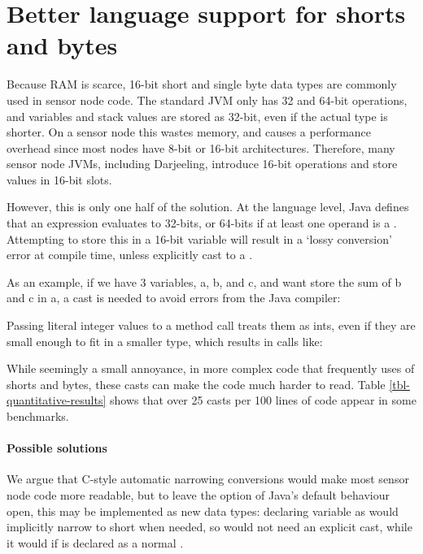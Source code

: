 \section{Better language support for shorts and bytes}
\label{sec-small-datatypes}
Because RAM is scarce, 16-bit short and single byte data types are commonly used in sensor node code. The standard JVM only has 32 and 64-bit operations, and variables and stack values are stored as 32-bit, even if the actual type is shorter. On a sensor node this wastes memory, and causes a performance overhead since most nodes have 8-bit or 16-bit architectures. Therefore, many sensor node JVMs, including Darjeeling, introduce 16-bit operations and store values in 16-bit slots.

However, this is only one half of the solution. At the language level, Java defines that an expression evaluates to 32-bits, or 64-bits if at least one operand is a . Attempting to store this in a 16-bit variable will result in a `lossy conversion' error at compile time, unless explicitly cast to a .

As an example, if we have 3  variables, a, b, and c, and want store the sum of b and c in a, a cast is needed to avoid errors from the Java compiler:


Passing literal integer values to a method call treats them as ints, even if they are small enough to fit in a smaller type, which results in calls like: 


While seemingly a small annoyance, in more complex code that frequently uses of shorts and bytes, these casts can make the code much harder to read. Table \ref{tbl-quantitative-results} shows that over 25 casts per 100 lines of code appear in some benchmarks.

\paragraph{Possible solutions}

We argue that C-style automatic narrowing conversions would make most sensor node code more readable, but to leave the option of Java's default behaviour open, this may be implemented as new data types: declaring variable  as  would implicitly narrow to short when needed, so  would not need an explicit cast, while it would if  is declared as a normal .




